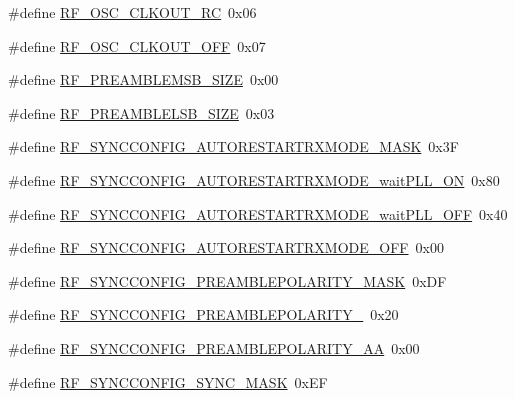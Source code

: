 \begin{DoxyCompactItemize}
\item 
\#define \mbox{\hyperlink{sx1276_regs-_fsk_8h_a69fef930e480b9c06fcb24746b6531cf}{R\+F\+\_\+\+O\+S\+C\+\_\+\+C\+L\+K\+O\+U\+T\+\_\+\+RC}}~0x06
\item 
\#define \mbox{\hyperlink{sx1276_regs-_fsk_8h_a5bef2e0155da1ee7ba0486ddd82b36cc}{R\+F\+\_\+\+O\+S\+C\+\_\+\+C\+L\+K\+O\+U\+T\+\_\+\+O\+FF}}~0x07
\item 
\#define \mbox{\hyperlink{sx1276_regs-_fsk_8h_a350e72bb75827ba417c04247092659f2}{R\+F\+\_\+\+P\+R\+E\+A\+M\+B\+L\+E\+M\+S\+B\+\_\+\+S\+I\+ZE}}~0x00
\item 
\#define \mbox{\hyperlink{sx1276_regs-_fsk_8h_aad343150a42f37198320692e62456844}{R\+F\+\_\+\+P\+R\+E\+A\+M\+B\+L\+E\+L\+S\+B\+\_\+\+S\+I\+ZE}}~0x03
\item 
\#define \mbox{\hyperlink{sx1276_regs-_fsk_8h_a74e4ab5de0446cd3ca9dce0ddad065e3}{R\+F\+\_\+\+S\+Y\+N\+C\+C\+O\+N\+F\+I\+G\+\_\+\+A\+U\+T\+O\+R\+E\+S\+T\+A\+R\+T\+R\+X\+M\+O\+D\+E\+\_\+\+M\+A\+SK}}~0x3F
\item 
\#define \mbox{\hyperlink{sx1276_regs-_fsk_8h_a2f058df94f014d92ffc1ec9579523488}{R\+F\+\_\+\+S\+Y\+N\+C\+C\+O\+N\+F\+I\+G\+\_\+\+A\+U\+T\+O\+R\+E\+S\+T\+A\+R\+T\+R\+X\+M\+O\+D\+E\+\_\+wait\+P\+L\+L\+\_\+\+ON}}~0x80
\item 
\#define \mbox{\hyperlink{sx1276_regs-_fsk_8h_a8786c863c14c55f260733788c5478fc5}{R\+F\+\_\+\+S\+Y\+N\+C\+C\+O\+N\+F\+I\+G\+\_\+\+A\+U\+T\+O\+R\+E\+S\+T\+A\+R\+T\+R\+X\+M\+O\+D\+E\+\_\+wait\+P\+L\+L\+\_\+\+O\+FF}}~0x40
\item 
\#define \mbox{\hyperlink{sx1276_regs-_fsk_8h_ac2c0f0cad363bba58dcdcc0bebbbbf56}{R\+F\+\_\+\+S\+Y\+N\+C\+C\+O\+N\+F\+I\+G\+\_\+\+A\+U\+T\+O\+R\+E\+S\+T\+A\+R\+T\+R\+X\+M\+O\+D\+E\+\_\+\+O\+FF}}~0x00
\item 
\#define \mbox{\hyperlink{sx1276_regs-_fsk_8h_aabfc2e96ddfb3844b90e9c9dc455dcaa}{R\+F\+\_\+\+S\+Y\+N\+C\+C\+O\+N\+F\+I\+G\+\_\+\+P\+R\+E\+A\+M\+B\+L\+E\+P\+O\+L\+A\+R\+I\+T\+Y\+\_\+\+M\+A\+SK}}~0x\+DF
\item 
\#define \mbox{\hyperlink{sx1276_regs-_fsk_8h_a9aa039b3727ca99daa81e3e9b6710a97}{R\+F\+\_\+\+S\+Y\+N\+C\+C\+O\+N\+F\+I\+G\+\_\+\+P\+R\+E\+A\+M\+B\+L\+E\+P\+O\+L\+A\+R\+I\+T\+Y\+\_}}~0x20
\item 
\#define \mbox{\hyperlink{sx1276_regs-_fsk_8h_a413dee0514df5bc1fa6a1aa64c08c55f}{R\+F\+\_\+\+S\+Y\+N\+C\+C\+O\+N\+F\+I\+G\+\_\+\+P\+R\+E\+A\+M\+B\+L\+E\+P\+O\+L\+A\+R\+I\+T\+Y\+\_\+\+AA}}~0x00
\item 
\#define \mbox{\hyperlink{sx1276_regs-_fsk_8h_adde21fff1779d6bb7165ccc5982e255a}{R\+F\+\_\+\+S\+Y\+N\+C\+C\+O\+N\+F\+I\+G\+\_\+\+S\+Y\+N\+C\+\_\+\+M\+A\+SK}}~0x\+EF

\end{DoxyCompactItemize}
